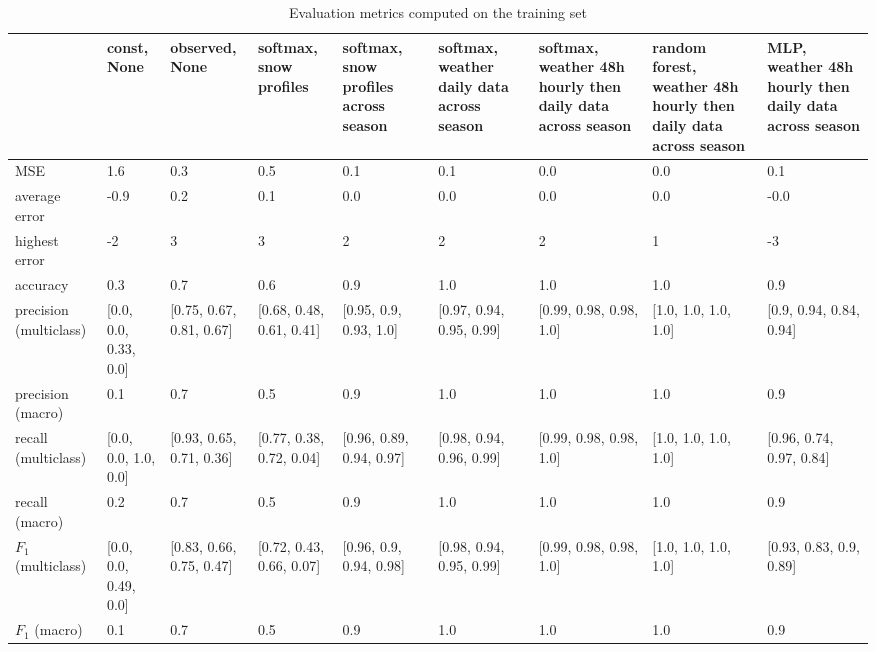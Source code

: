 \begin{table}[H]
\caption{Evaluation metrics computed on the training set}
\label{tbl:sais_eval_training}
\begin{tabular}{lllllllll}
\toprule
 & const, None & observed, None & softmax, snow profiles & softmax, snow profiles across season & softmax, weather daily data across season & softmax, weather 48h hourly then daily data across season & random forest, weather 48h hourly then daily data across season & MLP, weather 48h hourly then daily data across season \\
\midrule
MSE & 1.6 & 0.3 & 0.5 & 0.1 & 0.1 & 0.0 & 0.0 & 0.1 \\
average error & -0.9 & 0.2 & 0.1 & 0.0 & 0.0 & 0.0 & 0.0 & -0.0 \\
highest error & -2 & 3 & 3 & 2 & 2 & 2 & 1 & -3 \\
accuracy & 0.3 & 0.7 & 0.6 & 0.9 & 1.0 & 1.0 & 1.0 & 0.9 \\
precision (multiclass) & [0.0, 0.0, 0.33, 0.0] & [0.75, 0.67, 0.81, 0.67] & [0.68, 0.48, 0.61, 0.41] & [0.95, 0.9, 0.93, 1.0] & [0.97, 0.94, 0.95, 0.99] & [0.99, 0.98, 0.98, 1.0] & [1.0, 1.0, 1.0, 1.0] & [0.9, 0.94, 0.84, 0.94] \\
precision (macro) & 0.1 & 0.7 & 0.5 & 0.9 & 1.0 & 1.0 & 1.0 & 0.9 \\
recall (multiclass) & [0.0, 0.0, 1.0, 0.0] & [0.93, 0.65, 0.71, 0.36] & [0.77, 0.38, 0.72, 0.04] & [0.96, 0.89, 0.94, 0.97] & [0.98, 0.94, 0.96, 0.99] & [0.99, 0.98, 0.98, 1.0] & [1.0, 1.0, 1.0, 1.0] & [0.96, 0.74, 0.97, 0.84] \\
recall (macro) & 0.2 & 0.7 & 0.5 & 0.9 & 1.0 & 1.0 & 1.0 & 0.9 \\
$F_1$ (multiclass) & [0.0, 0.0, 0.49, 0.0] & [0.83, 0.66, 0.75, 0.47] & [0.72, 0.43, 0.66, 0.07] & [0.96, 0.9, 0.94, 0.98] & [0.98, 0.94, 0.95, 0.99] & [0.99, 0.98, 0.98, 1.0] & [1.0, 1.0, 1.0, 1.0] & [0.93, 0.83, 0.9, 0.89] \\
$F_1$ (macro) & 0.1 & 0.7 & 0.5 & 0.9 & 1.0 & 1.0 & 1.0 & 0.9 \\
\bottomrule
\end{tabular}
\end{table}
